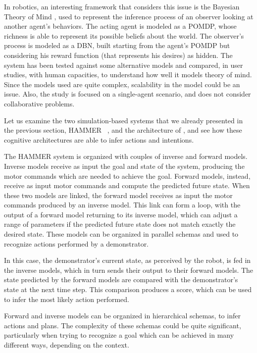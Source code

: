 In robotics, an interesting framework that considers this issue is the Bayesian Theory of Mind \cite{baker2014modeling}, used to represent the inference process of an observer looking at another agent's behaviors. The acting agent is modeled as a POMDP, whose richness is able to represent its possible beliefs about the world. The observer's process is modeled as a DBN, built starting from the agent's POMDP but considering his reward function (that represents his desires) as hidden. The system has been tested against some alternative models and compared, in user studies, with human capacities, to understand how well it models theory of mind. Since the models used are quite complex, scalability in the model could be an issue. Also, the study is focused on a single-agent scenario, and does not consider collaborative problems.

Let us examine the two simulation-based systems that we already presented in the previous section, HAMMER ~\cite{demiris2007prediction}, and the architecture of \cite{BreazealGB09}, and see how these cognitive architectures are able to infer actions and intentions.

The HAMMER system is organized with couples of inverse and forward models.  Inverse models receive as input the goal and state of the system, producing the motor commands which are needed to achieve the goal. Forward models, instead, receive as input motor commands and compute the predicted future state. When these two models are linked, the forward model receives as input the motor commands produced by an inverse model. This link can form a loop, with the output of a forward model returning to its inverse model, which can adjust a range of parameters if the predicted future state does not match exactly the desired state. These models can be organized in parallel schemas and used to recognize actions performed by a demonstrator. 

In this case, the demonstrator's current state, as perceived by the robot, is fed in the inverse models, which in turn sends their output to their forward models. The state predicted by the forward models are compared with the demonstrator's state at the next time step. This comparison produces a score, which can be used to infer the most likely action performed. 

Forward and inverse models can be organized in hierarchical schemas, to infer actions and plans. The complexity of these schemas could be quite significant, particularly when trying to recognize a goal which can be achieved in many different ways, depending on the context. 

